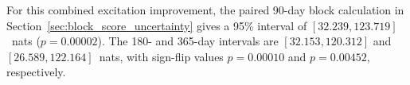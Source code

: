 For this combined excitation improvement, the paired 90-day block calculation in Section~\ref{sec:block_score_uncertainty} gives a 95\% interval of $[32.239,123.719]$~nats ($p=0.00002$). The 180- and 365-day intervals are $[32.153,120.312]$ and $[26.589,122.164]$~nats, with sign-flip values $p=0.00010$ and $p=0.00452$, respectively.
